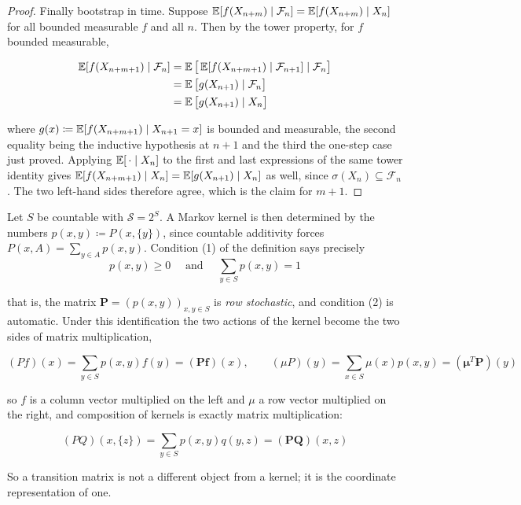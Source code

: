 \begin{proof}
		Finally bootstrap in time. Suppose $\operatorname{\mathbb{E}}[f(X_{n+m}) \mid \mathcal{F}_n] = \operatorname{\mathbb{E}}[f(X_{n+m}) \mid X_n]$ for all bounded measurable $f$ and all $n$. Then by the tower property, for $f$ bounded measurable,

			\begin{align*}
				\operatorname{\mathbb{E}}[f(X_{n+m+1}) \mid \mathcal{F}_n] & = \operatorname{\mathbb{E}}\big[ \operatorname{\mathbb{E}}[f(X_{n+m+1}) \mid \mathcal{F}_{n+1}] \mid \mathcal{F}_n \big] \\
				& = \operatorname{\mathbb{E}}\big[ g(X_{n+1}) \mid \mathcal{F}_n \big] \\
				& = \operatorname{\mathbb{E}}\big[ g(X_{n+1}) \mid X_n \big]
			\end{align*}

		where $g(x) \coloneqq \operatorname{\mathbb{E}}[f(X_{n+m+1}) \mid X_{n+1} = x]$ is bounded and measurable, the second equality being the inductive hypothesis at $n+1$ and the third the one-step case just proved. Applying $\operatorname{\mathbb{E}}[\,\cdot \mid X_n]$ to the first and last expressions of the same tower identity gives $\operatorname{\mathbb{E}}[f(X_{n+m+1}) \mid X_n] = \operatorname{\mathbb{E}}[g(X_{n+1}) \mid X_n]$ as well, since $\sigma(X_n) \subseteq \mathcal{F}_n$. The two left-hand sides therefore agree, which is the claim for $m+1$.
	\end{proof}

	\begin{example}
		\label{ex:markov-kernels-on-a-countable-state-space}
		Let $S$ be countable with $\mathcal{S} = 2^S$. A Markov kernel is then determined by the numbers $p(x, y) \coloneqq P(x, \{y\})$, since countable additivity forces $P(x, A) = \sum_{y \in A} p(x, y)$. Condition (1) of the definition says precisely
		\begin{equation}
			p(x, y) \geq 0 \quad \text{ and } \quad \sum_{y \in S} p(x, y) = 1
		\end{equation}

		that is, the matrix $\mathbf{P} = (p(x, y))_{x, y \in S}$ is \textit{row stochastic}, and condition (2) is automatic. Under this identification the two actions of the kernel become the two sides of matrix multiplication,

		\begin{equation}
			(P f)(x) = \sum_{y \in S} p(x, y) f(y) = (\mathbf{P} \mathbf{f})(x), \qquad (\mu P)(y) = \sum_{x \in S} \mu(x) p(x, y) = (\boldsymbol{\mu}^T \mathbf{P})(y)
		\end{equation}

		so $f$ is a column vector multiplied on the left and $\mu$ a row vector multiplied on the right, and composition of kernels is exactly matrix multiplication:

		\begin{equation}
			(P Q)(x, \{z\}) = \sum_{y \in S} p(x, y) q(y, z) = (\mathbf{P} \mathbf{Q})(x, z)
		\end{equation}

		So a transition matrix is not a different object from a kernel; it is the coordinate representation of one.
	\end{example}

